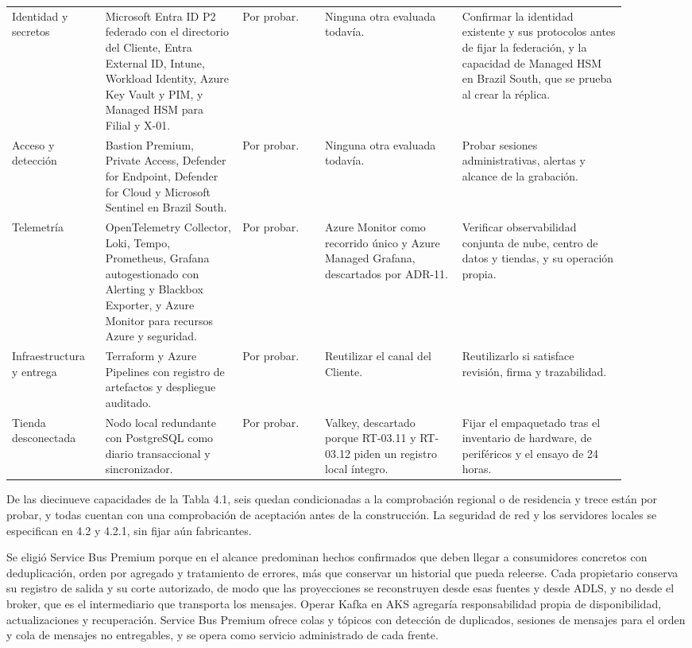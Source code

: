 \documentclass[11pt]{article}
\begin{document}
\begin{longtable}{@{}p{0.135\linewidth}p{0.2\linewidth}p{0.12\linewidth}p{0.2\linewidth}p{0.245\linewidth}@{}}
Identidad y secretos & Microsoft Entra ID P2 federado con el directorio del Cliente, Entra External ID, Intune, Workload Identity, Azure Key Vault y PIM, y Managed HSM para Filial y X-01. & Por probar. & Ninguna otra evaluada todavía. & Confirmar la identidad existente y sus protocolos antes de fijar la federación, y la capacidad de Managed HSM en Brazil South, que se prueba al crear la réplica. \\
Acceso y detección & Bastion Premium, Private Access, Defender for Endpoint, Defender for Cloud y Microsoft Sentinel en Brazil South. & Por probar. & Ninguna otra evaluada todavía. & Probar sesiones administrativas, alertas y alcance de la grabación. \\
Telemetría & OpenTelemetry Collector, Loki, Tempo, Prometheus, Grafana autogestionado con Alerting y Blackbox Exporter, y Azure Monitor para recursos Azure y seguridad. & Por probar. & Azure Monitor como recorrido único y Azure Managed Grafana, descartados por ADR-11. & Verificar observabilidad conjunta de nube, centro de datos y tiendas, y su operación propia. \\
Infraestructura y entrega & Terraform y Azure Pipelines con registro de artefactos y despliegue auditado. & Por probar. & Reutilizar el canal del Cliente. & Reutilizarlo si satisface revisión, firma y trazabilidad. \\
Tienda desconectada & Nodo local redundante con PostgreSQL como diario transaccional y sincronizador. & Por probar. & Valkey, descartado porque RT-03.11 y RT-03.12 piden un registro local íntegro. & Fijar el empaquetado tras el inventario de hardware, de periféricos y el ensayo de 24 horas. \\
\end{longtable}

De las diecinueve capacidades de la Tabla 4.1, seis quedan condicionadas a la comprobación regional o de residencia y trece están por probar, y todas cuentan con una comprobación de aceptación antes de la construcción. La seguridad de red y los servidores locales se especifican en 4.2 y 4.2.1, sin fijar aún fabricantes.

Se eligió Service Bus Premium porque en el alcance predominan hechos confirmados que deben llegar a consumidores concretos con deduplicación, orden por agregado y tratamiento de errores, más que conservar un historial que pueda releerse. Cada propietario conserva su registro de salida y su corte autorizado, de modo que las proyecciones se reconstruyen desde esas fuentes y desde ADLS, y no desde el broker, que es el intermediario que transporta los mensajes. Operar Kafka en AKS agregaría responsabilidad propia de disponibilidad, actualizaciones y recuperación. Service Bus Premium ofrece colas y tópicos con detección de duplicados, sesiones de mensajes para el orden y cola de mensajes no entregables, y se opera como servicio administrado de cada frente.
\end{document}

